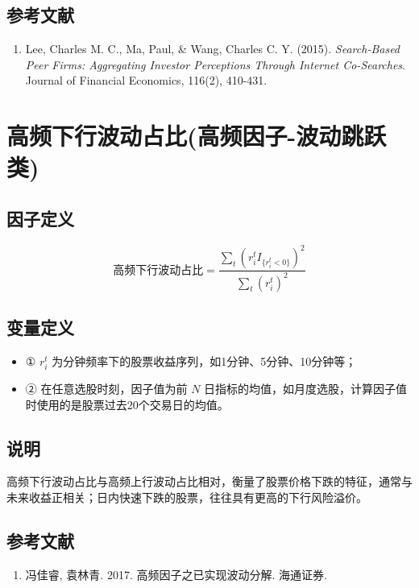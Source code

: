 \documentclass{article}
\begin{document}
\subsection{参考文献}
\begin{enumerate}
    \item Lee, Charles M. C., Ma, Paul, \& Wang, Charles C. Y. (2015). \textit{Search-Based Peer Firms: Aggregating Investor Perceptions Through Internet Co-Searches}. Journal of Financial Economics, 116(2), 410-431.
\end{enumerate}

\section{高频下行波动占比(高频因子-波动跳跃类)}

\subsection{因子定义}
\begin{equation}
    \text{高频下行波动占比} = \frac{\sum_{t} (r_{i}^tI_{\{r_i^t<0\}})^2  }{\sum_{t} (r_{i}^t)^2}
\end{equation}

\subsection{变量定义}
\begin{itemize}
    \item ① \( r_{i}^t \) 为分钟频率下的股票收益序列，如1分钟、5分钟、10分钟等；
    \item ② 在任意选股时刻，因子值为前 \( N \) 日指标的均值，如月度选股，计算因子值时使用的是股票过去20个交易日的均值。
\end{itemize}

\subsection{说明}
高频下行波动占比与高频上行波动占比相对，衡量了股票价格下跌的特征，通常与未来收益正相关；日内快速下跌的股票，往往具有更高的下行风险溢价。

\subsection{参考文献}
\begin{enumerate}
    \item 冯佳睿, 袁林青. 2017. 高频因子之已实现波动分解. 海通证券.
\end{enumerate}
\end{document}
